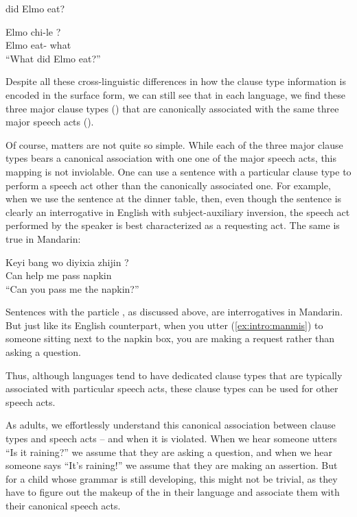  did Elmo eat?
\eex

\gll Elmo chi-le ?\\
Elmo eat-\Asp{} what\\
``What did Elmo eat?''
\eex

Despite all these cross-linguistic differences in how the clause type information is encoded in the surface form, we can still see that in each language, we find these three major clause types (\diis{}) that are canonically associated with the same three major speech acts (\aqrs{}). 

Of course, matters are not quite so simple. While each of the three major clause types bears a canonical association with one one of the major speech acts, this mapping is not inviolable. One can use a sentence with a particular clause type to perform a speech act other than the canonically associated one. For example, when we use the sentence  at the dinner table, then, even though the sentence is clearly an interrogative in English with subject-auxiliary inversion, the speech act performed by the speaker is best characterized as a requesting act. The same is true in Mandarin:

\gll Keyi bang wo diyixia zhijin ?\\
Can help me pass napkin \Sfp{}\\
``Can you pass me the napkin?''
\eex

Sentences with the particle , as discussed above, are interrogatives in Mandarin. But just like its English counterpart, when you utter (\ref{ex:intro:manmis}) to someone sitting next to the napkin box, you are making a request rather than asking a question. 

Thus, although languages tend to have dedicated clause types that are typically associated with particular speech acts, these clause types can be used for other speech acts. 

As adults, we effortlessly understand this canonical association between clause types and speech acts -- and when it is violated. When we hear someone utters ``Is it raining?'' we assume that they are asking a question, and when we hear someone says ``It's raining!'' we assume that they are making an assertion.  But for a child whose grammar is still developing, this might not be trivial, as they have to figure out the makeup of the \diis{} in their language and associate them with their canonical speech acts.   %

